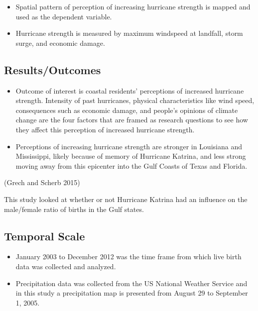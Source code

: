 \documentclass[
]{article}
\providecommand{\tightlist}{%
  \setlength{\itemsep}{0pt}\setlength{\parskip}{0pt}}
\begin{document}
\begin{itemize}
\tightlist
\item
  Spatial pattern of perception of increasing hurricane strength is
  mapped and used as the dependent variable.
\item
  Hurricane strength is measured by maximum windspeed at landfall, storm
  surge, and economic damage.
\end{itemize}

\hypertarget{resultsoutcomes-18}{%
\subsection{Results/Outcomes}\label{resultsoutcomes-18}}

\begin{itemize}
\tightlist
\item
  Outcome of interest is coastal residents' perceptions of increased
  hurricane strength. Intensity of past hurricanes, physical
  characteristics like wind speed, consequences such as economic damage,
  and people's opinions of climate change are the four factors that are
  framed as research questions to see how they affect this perception of
  increased hurricane strength.
\item
  Perceptions of increasing hurricane strength are stronger in Louisiana
  and Mississippi, likely because of memory of Hurricane Katrina, and
  less strong moving away from this epicenter into the Gulf Coasts of
  Texas and Florida.
\end{itemize}

(Grech and Scherb 2015)

This study looked at whether or not Hurricane Katrina had an influence
on the male/female ratio of births in the Gulf states.

\hypertarget{temporal-scale-30}{%
\subsection{Temporal Scale}\label{temporal-scale-30}}

\begin{itemize}
\tightlist
\item
  January 2003 to December 2012 was the time frame from which live birth
  data was collected and analyzed.
\item
  Precipitation data was collected from the US National Weather Service
  and in this study a precipitation map is presented from August 29 to
  September 1, 2005.
\end{itemize}
\end{document}
